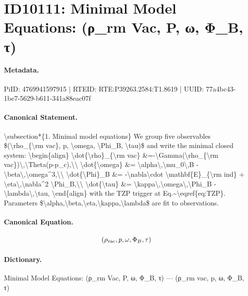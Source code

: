 \section*{ID10111: Minimal Model Equations: (ρ\_rm Vac, P, ω, Φ\_B, τ)}
\paragraph{Metadata.}
PiID: 4769941597915 | RTEID: RTE:P39263.2584:T1.8619 | UUID: 77a4bc43-1be7-5629-b611-341a88eac07f

\paragraph{Canonical Statement.}
\textbackslash{}subsection*\{1. Minimal model equations\} We group five observables \$(\textbackslash{}rho\_\{\textbackslash{}rm vac\}, p, \textbackslash{}omega, \textbackslash{}Phi\_B, \textbackslash{}tau)\$ and write the minimal closed system: \textbackslash{}begin\{align\} \textbackslash{}dot\{\textbackslash{}rho\}\_\{\textbackslash{}rm vac\} \&=-\textbackslash{}Gamma(\textbackslash{}rho\_\{\textbackslash{}rm vac\})\textbackslash{},\textbackslash{}Theta(p-p\_c),\textbackslash{}\textbackslash{} \textbackslash{}dot\{\textbackslash{}omega\} \&= \textbackslash{}alpha\textbackslash{},\textbackslash{}mu\_0\textbackslash{},B - \textbackslash{}beta\textbackslash{},\textbackslash{}omega\textasciicircum{}3,\textbackslash{}\textbackslash{} \textbackslash{}dot\{\textbackslash{}Phi\}\_B \&= -\textbackslash{}nabla\textbackslash{}cdot \textbackslash{}mathbf\{E\}\_\{\textbackslash{}rm ind\} + \textbackslash{}eta\textbackslash{},\textbackslash{}nabla\textasciicircum{}2 \textbackslash{}Phi\_B,\textbackslash{}\textbackslash{} \textbackslash{}dot\{\textbackslash{}tau\} \&= \textbackslash{}kappa\textbackslash{},\textbackslash{}omega\textbackslash{},\textbackslash{}Phi\_B - \textbackslash{}lambda\textbackslash{},\textbackslash{}tau, \textbackslash{}end\{align\} with the TZP trigger at Eq.\textasciitilde{}\textbackslash{}eqref\{eq:TZP\}. Parameters \$\textbackslash{}alpha,\textbackslash{}beta,\textbackslash{}eta,\textbackslash{}kappa,\textbackslash{}lambda\$ are fit to observations.

\paragraph{Canonical Equation.}
\[
(\rho_{\rm vac}, p, \omega, \Phi_B, \tau)
\]

\paragraph{Dictionary.}
Minimal Model Equations: (ρ\_rm Vac, P, ω, Φ\_B, τ) — (ρ\_rm vac, p, ω, Φ\_B, τ)


